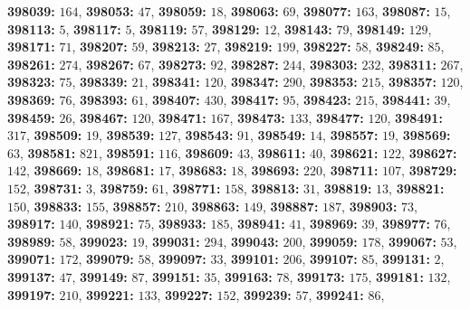 \textsf{\bfseries 398039:} $164$, \textsf{\bfseries 398053:} $47$, \textsf{\bfseries 398059:} $18$, \textsf{\bfseries 398063:} $69$, \textsf{\bfseries 398077:} $163$, \textsf{\bfseries 398087:} $15$, \textsf{\bfseries 398113:} $5$, \textsf{\bfseries 398117:} $5$, \textsf{\bfseries 398119:} $57$, \textsf{\bfseries 398129:} $12$, \textsf{\bfseries 398143:} $79$, \textsf{\bfseries 398149:} $129$, \textsf{\bfseries 398171:} $71$, \textsf{\bfseries 398207:} $59$, \textsf{\bfseries 398213:} $27$, \textsf{\bfseries 398219:} $199$, \textsf{\bfseries 398227:} $58$, \textsf{\bfseries 398249:} $85$, \textsf{\bfseries 398261:} $274$, \textsf{\bfseries 398267:} $67$, \textsf{\bfseries 398273:} $92$, \textsf{\bfseries 398287:} $244$, \textsf{\bfseries 398303:} $232$, \textsf{\bfseries 398311:} $267$, \textsf{\bfseries 398323:} $75$, \textsf{\bfseries 398339:} $21$, \textsf{\bfseries 398341:} $120$, \textsf{\bfseries 398347:} $290$, \textsf{\bfseries 398353:} $215$, \textsf{\bfseries 398357:} $120$, \textsf{\bfseries 398369:} $76$, \textsf{\bfseries 398393:} $61$, \textsf{\bfseries 398407:} $430$, \textsf{\bfseries 398417:} $95$, \textsf{\bfseries 398423:} $215$, \textsf{\bfseries 398441:} $39$, \textsf{\bfseries 398459:} $26$, \textsf{\bfseries 398467:} $120$, \textsf{\bfseries 398471:} $167$, \textsf{\bfseries 398473:} $133$, \textsf{\bfseries 398477:} $120$, \textsf{\bfseries 398491:} $317$, \textsf{\bfseries 398509:} $19$, \textsf{\bfseries 398539:} $127$, \textsf{\bfseries 398543:} $91$, \textsf{\bfseries 398549:} $14$, \textsf{\bfseries 398557:} $19$, \textsf{\bfseries 398569:} $63$, \textsf{\bfseries 398581:} $821$, \textsf{\bfseries 398591:} $116$, \textsf{\bfseries 398609:} $43$, \textsf{\bfseries 398611:} $40$, \textsf{\bfseries 398621:} $122$, \textsf{\bfseries 398627:} $142$, \textsf{\bfseries 398669:} $18$, \textsf{\bfseries 398681:} $17$, \textsf{\bfseries 398683:} $18$, \textsf{\bfseries 398693:} $220$, \textsf{\bfseries 398711:} $107$, \textsf{\bfseries 398729:} $152$, \textsf{\bfseries 398731:} $3$, \textsf{\bfseries 398759:} $61$, \textsf{\bfseries 398771:} $158$, \textsf{\bfseries 398813:} $31$, \textsf{\bfseries 398819:} $13$, \textsf{\bfseries 398821:} $150$, \textsf{\bfseries 398833:} $155$, \textsf{\bfseries 398857:} $210$, \textsf{\bfseries 398863:} $149$, \textsf{\bfseries 398887:} $187$, \textsf{\bfseries 398903:} $73$, \textsf{\bfseries 398917:} $140$, \textsf{\bfseries 398921:} $75$, \textsf{\bfseries 398933:} $185$, \textsf{\bfseries 398941:} $41$, \textsf{\bfseries 398969:} $39$, \textsf{\bfseries 398977:} $76$, \textsf{\bfseries 398989:} $58$, \textsf{\bfseries 399023:} $19$, \textsf{\bfseries 399031:} $294$, \textsf{\bfseries 399043:} $200$, \textsf{\bfseries 399059:} $178$, \textsf{\bfseries 399067:} $53$, \textsf{\bfseries 399071:} $172$, \textsf{\bfseries 399079:} $58$, \textsf{\bfseries 399097:} $33$, \textsf{\bfseries 399101:} $206$, \textsf{\bfseries 399107:} $85$, \textsf{\bfseries 399131:} $2$, \textsf{\bfseries 399137:} $47$, \textsf{\bfseries 399149:} $87$, \textsf{\bfseries 399151:} $35$, \textsf{\bfseries 399163:} $78$, \textsf{\bfseries 399173:} $175$, \textsf{\bfseries 399181:} $132$, \textsf{\bfseries 399197:} $210$, \textsf{\bfseries 399221:} $133$, \textsf{\bfseries 399227:} $152$, \textsf{\bfseries 399239:} $57$, \textsf{\bfseries 399241:} $86$, 

